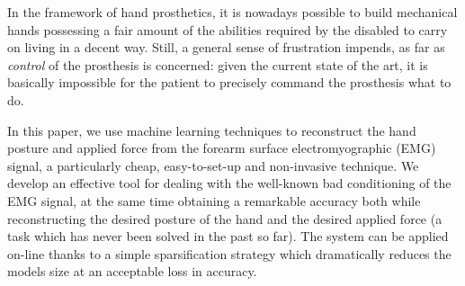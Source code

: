 In the framework of hand prosthetics, it is nowadays possible to build
mechanical hands possessing a fair amount of the abilities required by
the disabled to carry on living in a decent way. Still, a general
sense of frustration impends, as far as \emph{control} of the
prosthesis is concerned: given the current state of the art, it is
basically impossible for the patient to precisely command the
prosthesis what to do.

In this paper, we use machine learning techniques to reconstruct the
hand posture and applied force from the forearm surface
electromyographic (EMG) signal, a particularly cheap, easy-to-set-up
and non-invasive technique. We develop an effective tool for dealing
with the well-known bad conditioning of the EMG signal, at the same
time obtaining a remarkable accuracy both while reconstructing the
desired posture of the hand and the desired applied force (a task
which has never been solved in the past so far). The system can be
applied on-line thanks to a simple sparsification strategy which
dramatically reduces the models size at an acceptable loss in
accuracy.
